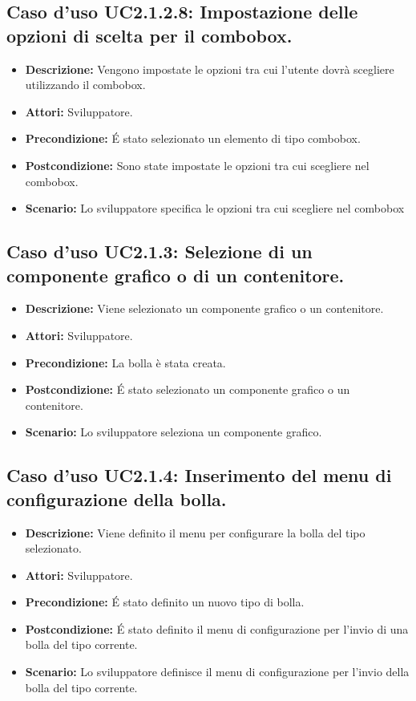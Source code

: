\subsection{Caso d'uso UC2.1.2.8: Impostazione delle opzioni di scelta per il combobox.}
\begin{itemize}
\item[]\textbf{Descrizione:} Vengono impostate le opzioni tra cui l'utente dovrà scegliere utilizzando il combobox.
\item[]\textbf{Attori:} Sviluppatore. 
\item[]\textbf{Precondizione:} \'E stato selezionato un elemento di tipo combobox. 
\item[]\textbf{Postcondizione:} Sono state impostate le opzioni tra cui scegliere nel combobox. 
\item[]\textbf{Scenario:}
Lo sviluppatore specifica le opzioni tra cui scegliere nel combobox 
\end{itemize}

\subsection{Caso d'uso UC2.1.3: Selezione di un componente grafico o di un contenitore.}
\begin{itemize}
\item[]\textbf{Descrizione:} Viene selezionato un componente grafico o un contenitore.
\item[]\textbf{Attori:} Sviluppatore. 
\item[]\textbf{Precondizione:} La bolla è stata creata. 
\item[]\textbf{Postcondizione:} \'E stato selezionato un componente grafico o un contenitore. 
\item[]\textbf{Scenario:}
 Lo sviluppatore seleziona un componente grafico. 
\end{itemize}

\subsection{Caso d'uso UC2.1.4: Inserimento del menu di configurazione della bolla.}
\begin{itemize}
\item[]\textbf{Descrizione:} Viene definito il menu per configurare la bolla del tipo selezionato.
\item[]\textbf{Attori:} Sviluppatore. 
\item[]\textbf{Precondizione:} \'E stato definito un nuovo tipo di bolla. 
\item[]\textbf{Postcondizione:} \'E stato definito il menu di configurazione per l'invio di una bolla del tipo corrente. 
\item[]\textbf{Scenario:}
Lo sviluppatore definisce il menu di configurazione per l'invio della bolla del tipo corrente. 
\end{itemize}

